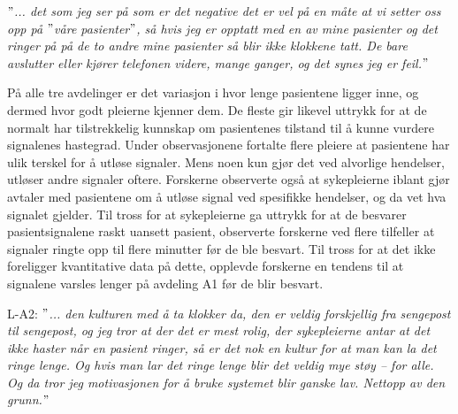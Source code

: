 \noindent
\textit{$"$... det som jeg ser på som er det negative det er vel på en måte at vi setter oss opp på $"$våre pasienter$"$, så hvis jeg er opptatt med en av mine pasienter og det ringer på på de to andre mine pasienter så blir ikke klokkene tatt. De bare avslutter eller kjører telefonen videre, mange ganger, og det synes jeg er feil.$"$}

\noindent
På alle tre avdelinger er det variasjon i hvor lenge pasientene ligger inne, og dermed hvor godt pleierne kjenner dem. De fleste gir likevel uttrykk for at de normalt har tilstrekkelig kunnskap om pasientenes tilstand til å kunne vurdere signalenes hastegrad. Under observasjonene fortalte flere pleiere at pasientene har ulik terskel for å utløse signaler. Mens noen kun gjør det ved alvorlige hendelser, utløser andre signaler oftere. Forskerne observerte også at sykepleierne iblant gjør avtaler med pasientene om å utløse signal ved spesifikke hendelser, og da vet hva signalet gjelder. Til tross for at sykepleierne ga uttrykk for at de besvarer pasientsignalene raskt uansett pasient, observerte forskerne ved flere tilfeller at signaler ringte opp til flere minutter før de ble besvart. Til tross for at det ikke foreligger kvantitative data på dette, opplevde forskerne en tendens til at signalene varsles lenger på avdeling A1 før de blir besvart.  
  
\noindent
L-A2: \textit{$"$... den kulturen med å ta klokker da, den er veldig forskjellig fra sengepost til sengepost, og jeg tror at der det er mest rolig, der sykepleierne antar at det ikke haster når en pasient ringer, så er det nok en kultur for at man kan la det ringe lenge. Og hvis man lar det ringe lenge blir det veldig mye støy – for alle. Og da tror jeg motivasjonen for å bruke systemet blir ganske lav. Nettopp av den grunn.$"$}

